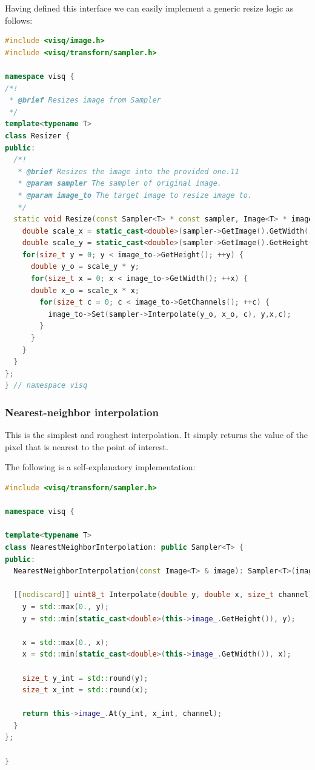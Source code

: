 \documentclass[11pt]{book}
\begin{document}
Having defined this interface we can easily implement a generic resize logic as follows:

\begin{lstlisting}[language=C++, caption={The implementation of resizer using sampler}]
#include <visq/image.h>
#include <visq/transform/sampler.h>

namespace visq {
/*!
 * @brief Resizes image from Sampler
 */
template<typename T>
class Resizer {
public:
  /*!
   * @brief Resizes the image into the provided one.11
   * @param sampler The sampler of original image.
   * @param image_to The target image to resize image to.
   */
  static void Resize(const Sampler<T> * const sampler, Image<T> * image_to) {
    double scale_x = static_cast<double>(sampler->GetImage().GetWidth()) /  image_to->GetWidth();
    double scale_y = static_cast<double>(sampler->GetImage().GetHeight()) /  image_to->GetHeight();
    for(size_t y = 0; y < image_to->GetHeight(); ++y) {
      double y_o = scale_y * y;
      for(size_t x = 0; x < image_to->GetWidth(); ++x) {
      double x_o = scale_x * x;
        for(size_t c = 0; c < image_to->GetChannels(); ++c) {
          image_to->Set(sampler->Interpolate(y_o, x_o, c), y,x,c);
        }
      }
    }
  }
};
} // namespace visq
\end{lstlisting}

\subsubsection{Nearest-neighbor interpolation}

This is the simplest and roughest interpolation. It simply returns the value of the pixel that is nearest to the point of interest. 

The following is a self-explanatory implementation:

\begin{lstlisting}[language=C++, caption={An implementation of the Nearest Neighbor interpolation}]
#include <visq/transform/sampler.h>

namespace visq {

template<typename T>
class NearestNeighborInterpolation: public Sampler<T> {
public:
  NearestNeighborInterpolation(const Image<T> & image): Sampler<T>(image) {}

  [[nodiscard]] uint8_t Interpolate(double y, double x, size_t channel) const override {
    y = std::max(0., y);
    y = std::min(static_cast<double>(this->image_.GetHeight()), y);

    x = std::max(0., x);
    x = std::min(static_cast<double>(this->image_.GetWidth()), x);

    size_t y_int = std::round(y);
    size_t x_int = std::round(x);

    return this->image_.At(y_int, x_int, channel);
  }
};

}
\end{lstlisting}
\end{document}
